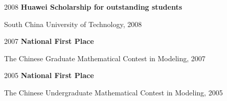 \begin{twocolentry}{2008}
\textbf{Huawei Scholarship for outstanding students}\end{twocolentry}
\vspace{0.20 cm}
\begin{onecolentry}
\begin{highlights}
\item South China University of Technology, 2008
\end{highlights}
\end{onecolentry}
\vspace{0.20 cm}

\begin{twocolentry}{2007}
\textbf{National First Place}\end{twocolentry}
\vspace{0.10 cm}
\begin{onecolentry}
\begin{highlights}
\item The Chinese Graduate Mathematical Contest in Modeling, 2007
\end{highlights}
\end{onecolentry}
\vspace{0.20 cm}

\begin{twocolentry}{2005}
\textbf{National First Place}\end{twocolentry}
\vspace{0.10 cm}
\begin{onecolentry}
\begin{highlights}
\item The Chinese Undergraduate Mathematical Contest in Modeling, 2005
\end{highlights}
\end{onecolentry}
\vspace{0.20 cm}
